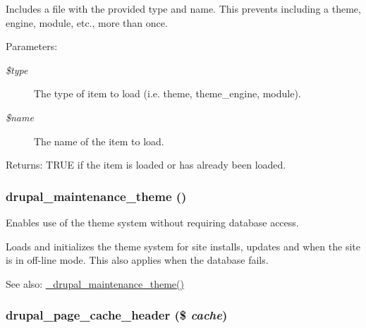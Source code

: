 Includes a file with the provided type and name. This prevents including a theme, engine, module, etc., more than once.

\begin{Desc}
\item[Parameters:]
\begin{description}
\item[{\em \$type}]The type of item to load (i.e. theme, theme\_\-engine, module). \item[{\em \$name}]The name of the item to load.\end{description}
\end{Desc}
\begin{Desc}
\item[Returns:]TRUE if the item is loaded or has already been loaded. \end{Desc}
\hypertarget{bootstrap_8inc_861d3f7c553fe62829f6c0f2e4fe89e6}{
\subsubsection[{drupal\_\-maintenance\_\-theme}]{\setlength{\rightskip}{0pt plus 5cm}drupal\_\-maintenance\_\-theme ()}}
\label{bootstrap_8inc_861d3f7c553fe62829f6c0f2e4fe89e6}


Enables use of the theme system without requiring database access.

Loads and initializes the theme system for site installs, updates and when the site is in off-line mode. This also applies when the database fails.

\begin{Desc}
\item[See also:]\hyperlink{theme_8maintenance_8inc_8f521a6aba04fc11935a874df3ad9f05}{\_\-drupal\_\-maintenance\_\-theme()} \end{Desc}
\hypertarget{bootstrap_8inc_e493c235ee5e28b3b5c664db14294dce}{
\subsubsection[{drupal\_\-page\_\-cache\_\-header}]{\setlength{\rightskip}{0pt plus 5cm}drupal\_\-page\_\-cache\_\-header (\$ {\em cache})}}
\label{bootstrap_8inc_e493c235ee5e28b3b5c664db14294dce}


